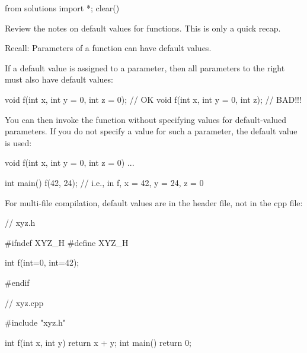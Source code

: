 \begin{python0}
from solutions import *; clear()
\end{python0}

Review the notes on default values for functions. This is only a quick
recap.

Recall: Parameters of a function can have default values.

If a default value is assigned to a parameter, then all parameters to
the right must also have default values:

\begin{consolethree}[escapeinside=||]
void f(int x, int y = 0, int z = 0); // OK
void f(int x, int y = 0, int z);     // BAD!!!
\end{consolethree}

You can then invoke the function without specifying values for
default-valued parameters. If you do not specify a value for such a
parameter, the default value is used:

\begin{consolethree}[escapeinside=||]
void f(int x, int y = 0, int z = 0) { ... }

int main()
{
    f(42, 24); // i.e., in f, x = 42, y = 24, z = 0
}
\end{consolethree}

For multi-file compilation, default values are in the header file, not
in the cpp file:

\begin{consolethree}[escapeinside=||]
// xyz.h

#ifndef XYZ_H
#define XYZ_H

int f(int=0, int=42);

#endif
\end{consolethree}

\begin{consolethree}[escapeinside=||]
// xyz.cpp

#include "xyz.h"

int f(int x, int y)
{
    return x + y;
}
int main()
{
    return 0;
}
\end{consolethree}




